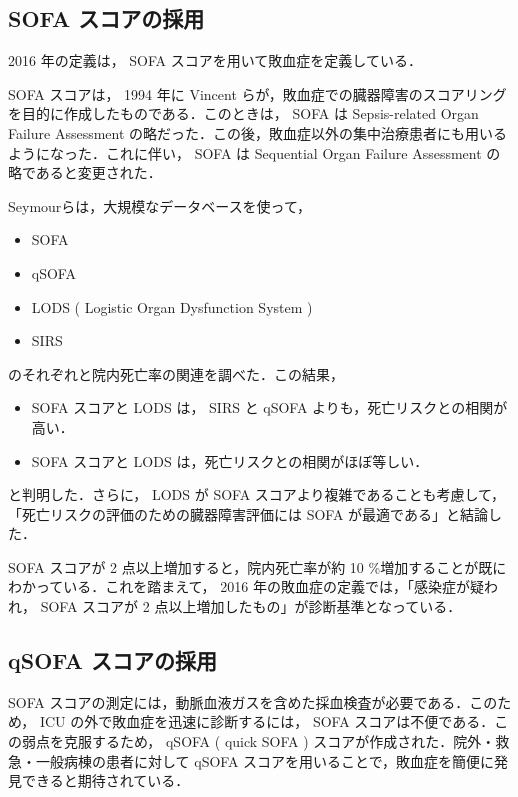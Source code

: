\documentclass[10pt,uplatex]{jsarticle}
\begin{document}
\subsection{SOFA スコアの採用}

2016 年の定義は， SOFA スコアを用いて敗血症を定義している．

SOFA スコアは， 1994 年に Vincent らが，敗血症での臓器障害のスコアリングを目的に作成したものである．このときは， SOFA は Sepsis-related Organ Failure Assessment の略だった．この後，敗血症以外の集中治療患者にも用いるようになった．これに伴い， SOFA は Sequential Organ Failure Assessment の略であると変更された．

Seymourらは，大規模なデータベースを使って，

\begin{itemize}
\item SOFA
\item qSOFA
\item LODS ( Logistic Organ Dysfunction System )
\item SIRS
\end{itemize}

のそれぞれと院内死亡率の関連を調べた．この結果，

\begin{itemize}
\item SOFA スコアと LODS は， SIRS と qSOFA よりも，死亡リスクとの相関が高い．
\item SOFA スコアと LODS は，死亡リスクとの相関がほぼ等しい．
\end{itemize}

と判明した．さらに， LODS が SOFA スコアより複雑であることも考慮して，「死亡リスクの評価のための臓器障害評価には SOFA が最適である」と結論した．

SOFA スコアが 2 点以上増加すると，院内死亡率が約 10 \%増加することが既にわかっている．これを踏まえて， 2016 年の敗血症の定義では，「感染症が疑われ， SOFA スコアが 2 点以上増加したもの」が診断基準となっている．

\subsection{qSOFA スコアの採用}

SOFA スコアの測定には，動脈血液ガスを含めた採血検査が必要である．このため， ICU の外で敗血症を迅速に診断するには， SOFA スコアは不便である．この弱点を克服するため， qSOFA ( quick SOFA ) スコアが作成された．院外・救急・一般病棟の患者に対して qSOFA スコアを用いることで，敗血症を簡便に発見できると期待されている．
\end{document}
